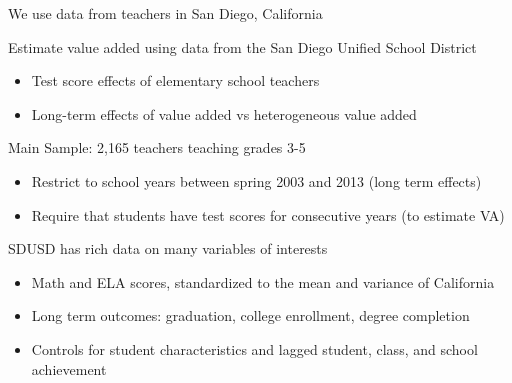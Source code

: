 \documentclass[t,aspectratio=169,11pt]{beamer}
\begin{document}

\begin{frame}{We use data from teachers in San Diego, California}

\vfill
\begin{wideitemize}
    \item  Estimate value added using data from the San Diego Unified School District
            \begin{itemize}
                \item Test score effects of elementary school teachers
                
                \item Long-term effects of value added vs heterogeneous value added
            \end{itemize}

    \item<2-> Main Sample: 2,165 teachers teaching grades 3-5
        
    \begin{itemize}
        \item Restrict to school years between spring 2003 and 2013 (long term effects)
        \item Require that students have test scores for consecutive years (to estimate VA)
    \end{itemize}    
        

    \item<3-> SDUSD has rich data on many variables of interests
        \begin{itemize}
        \item Math and ELA scores, standardized to the mean and variance of California
        \item Long term outcomes: graduation, college enrollment, degree completion
        \item Controls for student characteristics and lagged student, class, and school achievement
    \end{itemize}  
\end{wideitemize}
\vfill

\end{frame}


\end{document}
